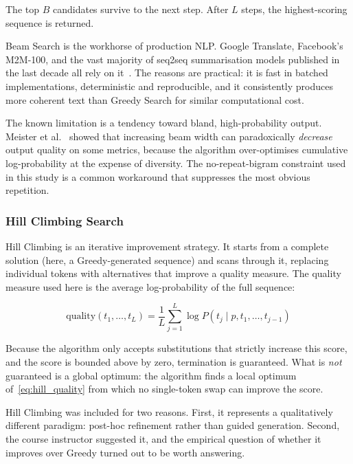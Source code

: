 \documentclass[12pt]{article}
\begin{document}
	The top $B$ candidates survive to the next step. After $L$ steps, the highest-scoring sequence is returned.
	
	Beam Search is the workhorse of production NLP. Google Translate, Facebook's M2M-100, and the vast majority of seq2seq summarisation models published in the last decade all rely on it~\cite{cho2014rnnencoder, see2017pointer}. The reasons are practical: it is fast in batched implementations, deterministic and reproducible, and it consistently produces more coherent text than Greedy Search for similar computational cost.
	
	The known limitation is a tendency toward bland, high-probability output. Meister et al.~\cite{meister2020beam} showed that increasing beam width can paradoxically \emph{decrease} output quality on some metrics, because the algorithm over-optimises cumulative log-probability at the expense of diversity. The no-repeat-bigram constraint used in this study is a common workaround that suppresses the most obvious repetition.
	
	\subsubsection{Hill Climbing Search}
	\label{sec:hillclimb_theory}
	
	Hill Climbing is an iterative improvement strategy. It starts from a complete solution (here, a Greedy-generated sequence) and scans through it, replacing individual tokens with alternatives that improve a quality measure. The quality measure used here is the average log-probability of the full sequence:
	
	\begin{equation}
		\mathrm{quality}(t_1, \ldots, t_L) = \frac{1}{L}\sum_{j=1}^{L}
		\log P(t_j \mid p, t_1, \ldots, t_{j-1})
		\label{eq:hill_quality}
	\end{equation}
	
	Because the algorithm only accepts substitutions that strictly increase this score, and the score is bounded above by zero, termination is guaranteed. What is \emph{not} guaranteed is a global optimum: the algorithm finds a local optimum of~\eqref{eq:hill_quality} from which no single-token swap can improve the score.
	
	Hill Climbing was included for two reasons. First, it represents a qualitatively different paradigm: post-hoc refinement rather than guided generation. Second, the course instructor suggested it, and the empirical question of whether it improves over Greedy turned out to be worth answering.
	
\end{document}
